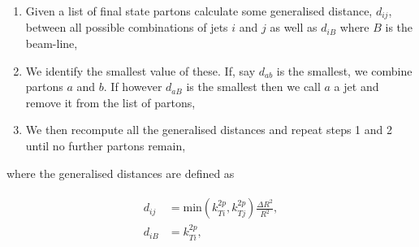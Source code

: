 	\begin{enumerate}
		\item Given a list of final state partons calculate some generalised distance, $d_{ij}$, between all possible
		      combinations of jets $i$ and $j$ as well as $d_{iB}$ where $B$ is the beam-line,
		\item We identify the smallest value of these.  If, say $d_{ab}$ is the smallest, we combine partons $a$ and $b$.
		      If however $d_{aB}$ is the smallest then we call $a$ a jet and remove it from the list of partons,
		\item We then recompute all the generalised distances and repeat steps 1 and 2 until no further partons remain,
	\end{enumerate}

	where the generalised distances are defined as

	\begin{align}
	\begin{split}
		d_{ij} &= \text{min}(k_{Ti}^{2p}, k_{Tj}^{2p})\frac{\Delta R^2}{R^2},\\
		d_{iB} &= k_{Ti}^{2p},
	\end{split}
	\end{align}

